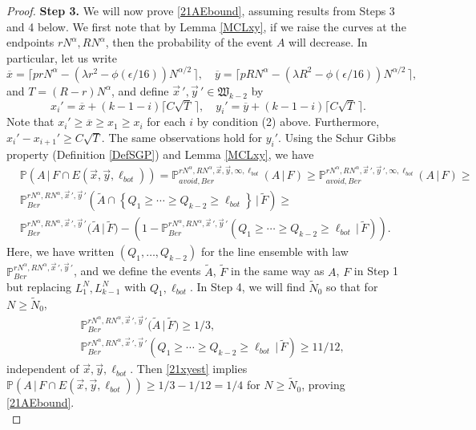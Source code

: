 \begin{proof}
		\noindent\textbf{Step 3.} We will now prove \eqref{21AEbound}, assuming results from Steps 3 and 4 below. We first note that by Lemma \ref{MCLxy}, if we raise the curves at the endpoints $rN^\alpha,RN^\alpha$, then the probability of the event $A$ will decrease. In particular, let us write
		\begin{equation}\label{21xybar}
		\overline{x} = \lceil prN^\alpha - (\lambda r^2 - \phi(\epsilon/16))N^{\alpha/2}\,\rceil, \quad \overline{y} = \lceil pRN^\alpha - (\lambda R^2 - \phi(\epsilon/16))N^{\alpha/2}\,\rceil,
		\end{equation} 
		and $T = (R-r)N^\alpha$, and define $\vec{x}\,',\vec{y}\,'\in\mathfrak{W}_{k-2}$ by
		\begin{equation*}
		x_i' = \overline{x} + (k-1-i)\lceil C\sqrt{T}\,\rceil, \quad
		y_i' = \overline{y} + (k-1-i)\lceil C\sqrt{T}\,\rceil.
		\end{equation*}
		Note that $x_i' \geq \overline{x} \geq x_1 \geq x_i$ for each $i$ by condition (2) above. Furthermore, $x_i' - x_{i+1}' \geq C\sqrt{T}$. The same observations hold for $y_i'$. Using the Schur Gibbs property (Definition \ref{DefSGP}) and Lemma \ref{MCLxy}, we have
		\begin{equation}\label{21xyest}
		\begin{split}
		&\mathbb{P}(A\,|\,F\cap E(\vec{x},\vec{y},\ell_{bot})) = \mathbb{P}^{rN^\alpha, RN^\alpha,\vec{x},\vec{y},\infty,\ell_{bot}}_{avoid,Ber} (A\,|\,F) \geq \mathbb{P}^{rN^\alpha, RN^\alpha,\vec{x}\,',\vec{y}\,',\infty,\ell_{bot}}_{avoid,Ber} (A\,|\,F) \geq \\
		&\mathbb{P}^{rN^\alpha, RN^\alpha,\vec{x}\,',\vec{y}\,'}_{Ber} \left(\tilde{A}\cap\left\{Q_1 \geq \cdots \geq Q_{k-2} \geq \ell_{bot}\right\}\,\big|\,\tilde F\right) \geq \\
		&\mathbb{P}^{rN^\alpha, RN^\alpha,\vec{x}\,',\vec{y}\,'}_{Ber} \big(\tilde A\,\big|\,\tilde F\big) - \left( 1 - \mathbb{P}^{rN^\alpha, RN^\alpha,\vec{x}\,',\vec{y}\,'}_{Ber} \left(Q_1 \geq \cdots \geq Q_{k-2} \geq \ell_{bot}\,\big|\,\tilde F\right)\right). 
		\end{split}
		\end{equation}
		Here, we have written $(Q_1,\dots,Q_{k-2})$ for the line ensemble with law $\mathbb{P}^{rN^\alpha, RN^\alpha,\vec{x}\,',\vec{y}\,'}_{Ber}$, and we define the events $\tilde A$, $\tilde F$ in the same way as $A$, $F$ in Step 1 but replacing $L_1^N, L_{k-1}^N$ with $Q_1, \ell_{bot}$. In Step 4, we will find $\tilde{N}_0$ so that for $N\geq\tilde{N}_0$, 
		\begin{align}
		& \mathbb{P}^{rN^\alpha, RN^\alpha,\vec{x}\,',\vec{y}\,'}_{Ber} \big(\tilde A\,\big|\,\tilde F \big) \geq 1/3, \label{21 1/3}\\
		& \mathbb{P}^{rN^\alpha, RN^\alpha,\vec{x}\,',\vec{y}\,'}_{Ber} \left(Q_1 \geq \cdots \geq Q_{k-2} \geq \ell_{bot}\,\big|\,\tilde F \right) \geq 11/12 \label{21 1/12},
		\end{align}
		independent of $\vec{x},\vec{y},\ell_{bot}$. Then \eqref{21xyest} implies $\mathbb{P}(A\,|\,F\cap E(\vec{x},\vec{y},\ell_{bot})) \geq 1/3 - 1/12 = 1/4$ for $N\geq\tilde{N}_0$, proving \eqref{21AEbound}.\\
		

\end{proof}
